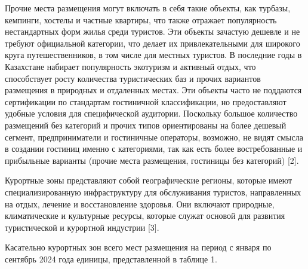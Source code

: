 \begin{multicols}{2}
Прочие места размещения могут включать в себя такие объекты, как
турбазы, кемпинги, хостелы и частные квартиры, что также отражает
популярность нестандартных форм жилья среди туристов. Эти объекты
зачастую дешевле и не требуют официальной категории, что делает их
привлекательными для широкого круга путешественников, в том числе для
местных туристов. В последние годы в Казахстане набирает популярность
экотуризм и активный отдых, что способствует росту количества
туристических баз и прочих вариантов размещения в природных и отдаленных
местах. Эти объекты часто не поддаются сертификации по стандартам
гостиничной классификации, но предоставляют удобные условия для
специфической аудитории. Поскольку большое количество размещений без
категорий и прочих типов ориентированы на более дешевый сегмент,
предприниматели и гостиничные операторы, возможно, не видят смысла в
создании гостиниц именно с категориями, так как есть более
востребованные и прибыльные варианты (прочие места размещения, гостиницы
без категорий) {[}2{]}.

Курортные зоны представляют собой географические регионы, которые имеют
специализированную инфраструктуру для обслуживания туристов,
направленных на отдых, лечение и восстановление здоровья. Они включают
природные, климатические и культурные ресурсы, которые служат основой
для развития туристической и курортной индустрии {[}3{]}.

Касательно курортных зон всего мест размещения на период с января по
сентябрь 2024 года  единицы, представленной в таблице 1.
\end{multicols}

